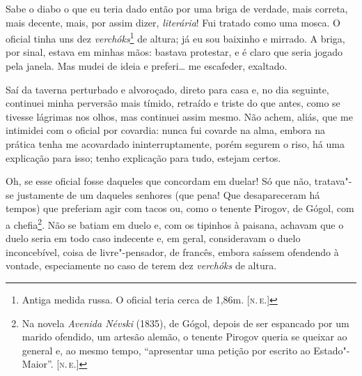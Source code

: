 Sabe o diabo o que eu teria dado então por uma briga de verdade, mais
correta, mais decente, mais, por assim dizer, \emph{literária}! Fui
tratado como uma mosca. O oficial tinha uns dez
\emph{verchóks}\footnote{Antiga medida russa. O oficial teria cerca de
  1,86m. {[}\textsc{n.\,e.}{]}} de altura; já eu sou baixinho e mirrado. A briga,
por sinal, estava em minhas mãos: bastava protestar, e é claro que seria
jogado pela janela. Mas mudei de ideia e preferi\ldots{} me escafeder,
exaltado.

Saí da taverna perturbado e alvoroçado, direto para casa e, no dia
seguinte, continuei minha perversão mais tímido, retraído e triste do
que antes, como se tivesse lágrimas nos olhos, mas continuei assim
mesmo. Não achem, aliás, que me intimidei com o oficial por covardia:
nunca fui covarde na alma, embora na prática tenha me acovardado
ininterruptamente, porém segurem o riso, há uma explicação para isso;
tenho explicação para tudo, estejam certos.

Oh, se esse oficial fosse daqueles que concordam em duelar! Só que não,
tratava"-se justamente de um daqueles senhores (que pena! Que
desapareceram há tempos) que preferiam agir com tacos ou, como o tenente
Pirogov, de Gógol, com a chefia\footnote{Na novela \emph{Avenida Névski}
  (1835), de Gógol, depois de ser espancado por um marido ofendido, um
  artesão alemão, o tenente Pirogov queria se queixar ao general e, ao
  mesmo tempo, ``apresentar uma petição por escrito ao Estado"-Maior''.
  {[}\textsc{n.\,e.}{]}}. Não se batiam em duelo e, com os tipinhos à paisana,
achavam que o duelo seria em todo caso indecente e, em geral,
consideravam o duelo inconcebível, coisa de livre"-pensador, de francês,
embora saíssem ofendendo à vontade, especiamente no caso de terem dez
\emph{verchóks} de altura.

